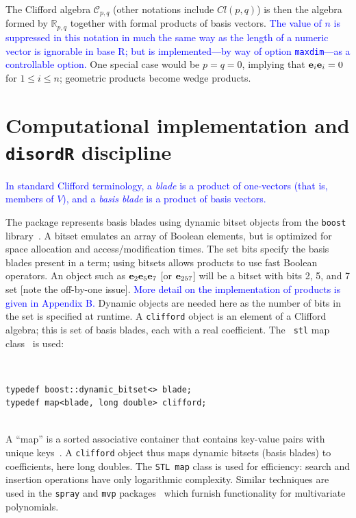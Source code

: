 \documentclass{birkjour}
\theoremstyle{definition}
\theoremstyle{remark}
\numberwithin{equation}{section}
\begin{document}
The Clifford algebra ${\mathcal C}_{p,q}$ (other notations include
$Cl(p,q)$) is then the algebra formed by $\mathbb{R}_{p,q}$ together
with formal products of basis vectors. \textcolor{blue}{The value of
  $n$ is suppressed in this notation in much the same way as the
  length of a numeric vector is ignorable in base R; but is
  implemented---by way of option {\tt maxdim}---as a controllable
  option.}  One special case would be $p=q=0$, implying that
${\bf e}_{i}{\bf e}_{i}=0$ for $1\leqslant i\leqslant n$; geometric products
become wedge products.

\section{Computational implementation and {\tt disordR} discipline}

\textcolor{blue}{ In standard Clifford terminology, a {\em blade} is a
  product of one-vectors (that is, members of $V$), and a {\em basis
    blade} is a product of basis vectors.}

The package represents basis blades using dynamic bitset objects from
the {\tt boost} library~\textcolor{blue}{\cite{karlsson2005}}.  A
bitset emulates an array of Boolean elements, but is optimized for
space allocation and access/modification times.  The set bits specify
the basis blades present in a term; using bitsets allows products to
use fast Boolean operators.  An object such as ${\bf e}_{2}{\bf e}_{5}{\bf e}_{7}$
[or ${\bf e}_{257}$] will be a bitset with bits 2, 5, and 7 set [note the
  off-by-one issue].  \textcolor{blue}{More detail on the
  implementation of products is given in Appendix B.}  Dynamic objects
are needed here as the number of bits in the set is specified at
runtime.  A {\tt clifford} object is an element of a Clifford algebra;
this is set of basis blades, each with a real coefficient.  The {\tt
  stl} map class~\cite{musser2009} is used:

{\ }\\[10pt]
\begin{verbatim}
typedef boost::dynamic_bitset<> blade;
typedef map<blade, long double> clifford;
\end{verbatim}

{\ }\\[10pt]

A ``map'' is a sorted associative container that contains key-value
pairs with unique keys~\cite{musser2009}.  A {\tt clifford} object
thus maps dynamic bitsets (basis blades) to coefficients, here long
doubles.  The {\tt STL map} class is used for efficiency: search and
insertion operations have only logarithmic complexity.  Similar
techniques are used in the {\tt spray} and {\tt mvp}
packages~\cite{hankin2022_mvp,hankin2022_spray} which furnish
functionality for multivariate polynomials.
\end{document}
